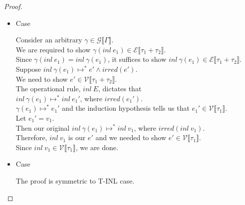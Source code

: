 \documentclass{article}
\begin{document}
\begin{proof}
\begin{itemize}
\begin{itemize}
\item Case \begin{mathpar}  \end{mathpar}
  Consider an arbitrary $\gamma \in \mathcal{G} \llbracket \Gamma \rrbracket$.\\
  We are required to show $\gamma(inl~e_1) \in \mathcal{E} \llbracket \tau_1 + \tau_2 \rrbracket$.\\
  Since $\gamma(inl~e_1) = inl~\gamma(e_1)$, it suffices to show $inl~\gamma(e_1) \in \mathcal{E} \llbracket \tau_1 + \tau_2 \rrbracket$.\\
  Suppose $inl~\gamma(e_1) \mapsto^* e' \wedge irred(e')$.\\
  We need to show $e' \in \mathcal{V} \llbracket \tau_1 + \tau_2 \rrbracket$.\\
  The operational rule, $inl~E$, dictates that\\
  $inl~\gamma(e_1) \mapsto^* inl~e_1'$, where $irred(e_1')$.\\
  $\gamma(e_1) \mapsto^* e_1'$ and the induction hypothesis tells us that $e_1' \in \mathcal{V} \llbracket \tau_1 \rrbracket$.\\
  Let $e_1' = v_1$.\\
  Then our original $inl~\gamma(e_1) \mapsto^* inl~v_1$, where $irred(inl~v_1)$.\\
  Therefore, $inl~v_1$ is our $e'$ and we needed to show $e' \in \mathcal{V} \llbracket \tau_1 \rrbracket$.\\
  Since $inl~v_1 \in \mathcal{V} \llbracket \tau_1 \rrbracket$, we are done.\\

\item Case \begin{mathpar}  \end{mathpar}
  The proof is symmetric to T-INL case.

\newpage          


\end{itemize}
\end{itemize}
\end{proof}
\end{document}
